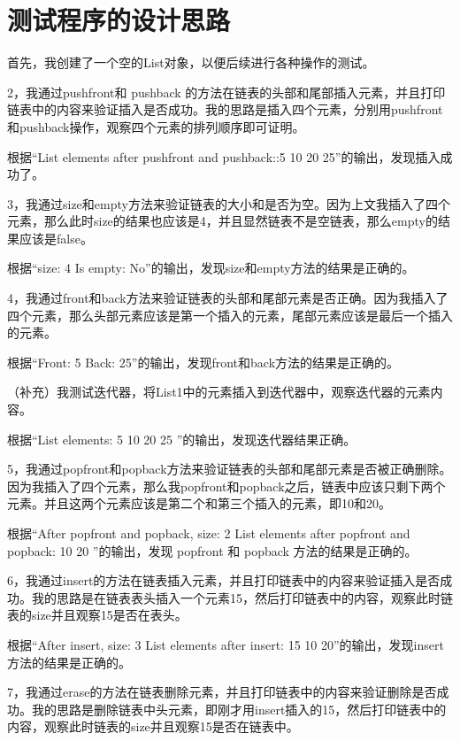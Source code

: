 \documentclass[UTF8]{ctexart}
\begin{document}
\pagestyle{fancy}
\fancyhead{}

\section{测试程序的设计思路}

首先，我创建了一个空的List对象，以便后续进行各种操作的测试。

2，我通过pushfront和 pushback 的方法在链表的头部和尾部插入元素，并且打印链表中的内容来验证插入是否成功。我的思路是插入四个元素，分别用pushfront和pushback操作，观察四个元素的排列顺序即可证明。

根据“List elements after pushfront and pushback::5 10 20 25”的输出，发现插入成功了。

3，我通过size和empty方法来验证链表的大小和是否为空。因为上文我插入了四个元素，那么此时size的结果也应该是4，并且显然链表不是空链表，那么empty的结果应该是false。

根据“size: 4  Is empty: No”的输出，发现size和empty方法的结果是正确的。

4，我通过front和back方法来验证链表的头部和尾部元素是否正确。因为我插入了四个元素，那么头部元素应该是第一个插入的元素，尾部元素应该是最后一个插入的元素。

根据“Front: 5  Back: 25”的输出，发现front和back方法的结果是正确的。

（补充）我测试迭代器，将List1中的元素插入到迭代器中，观察迭代器的元素内容。

根据“List elements: 5 10 20 25 ”的输出，发现迭代器结果正确。

5，我通过popfront和popback方法来验证链表的头部和尾部元素是否被正确删除。因为我插入了四个元素，那么我popfront和popback之后，链表中应该只剩下两个元素。并且这两个元素应该是第二个和第三个插入的元素，即10和20。

根据“After popfront and popback, size: 2  List elements after popfront and popback: 10 20 ”的输出，发现 popfront 和 popback 方法的结果是正确的。

6，我通过insert的方法在链表插入元素，并且打印链表中的内容来验证插入是否成功。我的思路是在链表表头插入一个元素15，然后打印链表中的内容，观察此时链表的size并且观察15是否在表头。

根据“After insert, size: 3  List elements after insert: 15 10 20”的输出，发现insert方法的结果是正确的。

7，我通过erase的方法在链表删除元素，并且打印链表中的内容来验证删除是否成功。我的思路是删除链表中头元素，即刚才用insert插入的15，然后打印链表中的内容，观察此时链表的size并且观察15是否在链表中。
\end{document}
